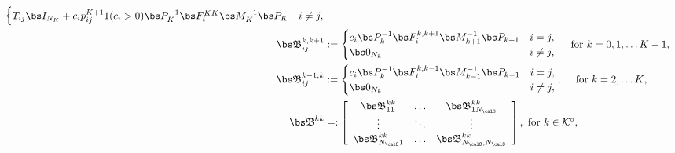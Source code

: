 \begin{align*}
\begin{cases}
T_{ij}\bs I_{N_K} + c_ip_{ij}^{K+1} 1(c_i>0)\bs P_K^{-1}\bs F_i^{KK}\bs M_K^{-1}\bs P_K & i \neq j,
\end{cases}
%
 \\\mathfrak{\bs B}^{k,k+1}_{ij} &:= \begin{cases}
	c_i\bs P_k^{-1}\bs F_i^{k,k+1}\bs M_{k+1}^{-1}\bs P_{k+1} & i = j, \\
	\bs 0_{N_k} & i \neq j,
    \end{cases}\quad \mbox{ for \(k=0,1,\dots K-1\),}
 \\\mathfrak{\bs B}^{k-1,k}_{ij} &:= \begin{cases}
    	c_i\bs P_k^{-1}\bs F_i^{k,k-1}\bs M_{k-1}^{-1}\bs P_{k-1} & i = j, \\
	\bs 0_{N_k} & i \neq j,
    \end{cases},\quad \mbox{ for \(k=2,\dots K\),}
\\
     {  {\mathfrak{\bs B}}}^{kk}%
    &=:\left[\begin{array}{ccc} {  {\mathfrak{\bs B}}}_{11}^{kk} &  \hdots &  {  {\mathfrak{\bs B}}}^{kk}_{1N_\calS}  \\ \vdots &\ddots & \vdots \\   {  {\mathfrak{\bs B}}}^{kk}_{N_\calS1} &  \hdots &  {  {\mathfrak{\bs B}}}^{kk}_{N_\calS,N_\calS} \end{array}\right], \mbox{ for \(k\in\mathcal K^\circ\),}

\end{align*}
